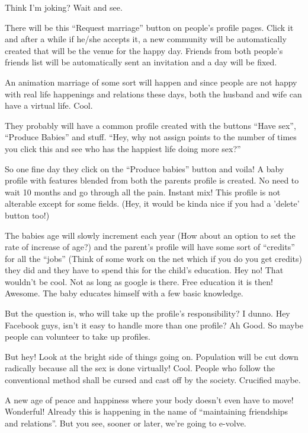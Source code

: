 \documentclass[twoside,11pt]{article}
\begin{document}
Think I'm joking? Wait and see.

There will be this ``Request marriage'' button on people's profile pages. Click it and after a while if he/she accepts it, a new community will be automatically created that will be the venue for the happy day. Friends from both people's friends list will be automatically sent an invitation and a day will be fixed.

An animation marriage of some sort will happen and since people are not happy with real life happenings and relations these days, both the husband and wife can have a virtual life. Cool.

They probably will have a common profile created with the buttons ``Have sex'', ``Produce Babies'' and stuff. ``Hey, why not assign points to the number of times you click this and see who has the happiest life doing more sex?''

So one fine day they click on the ``Produce babies'' button and voila! A baby profile with features blended from both the parents profile is created. No need to wait 10 months and go through all the pain. Instant mix! This profile is not alterable except for some fields. (Hey, it would be kinda nice if you had a 'delete' button too!)

The babies age will slowly increment each year (How about an option to set the rate of increase of age?) and the parent's profile will have some sort of ``credits'' for all the ``jobs'' (Think of some work on the net which if you do you get credits) they did and they have to spend this for the child's education. Hey no! That wouldn't be cool. Not as long as google is there. Free education it is then! Awesome. The baby educates himself with a few basic knowledge.

But the question is, who will take up the profile's responsibility? I dunno. Hey Facebook guys, isn't it easy to handle more than one profile? Ah Good. So maybe people can volunteer to take up profiles.

But hey! Look at the bright side of things going on. Population will be cut down radically because all the sex is done virtually! Cool. People who follow the conventional method shall be cursed and cast off by the society. Crucified maybe.

A new age of peace and happiness where your body doesn't even have to move! Wonderful! Already this is happening in the name of ``maintaining friendships and relations''. But you see, sooner or later, we're going to e-volve.
\end{document}
